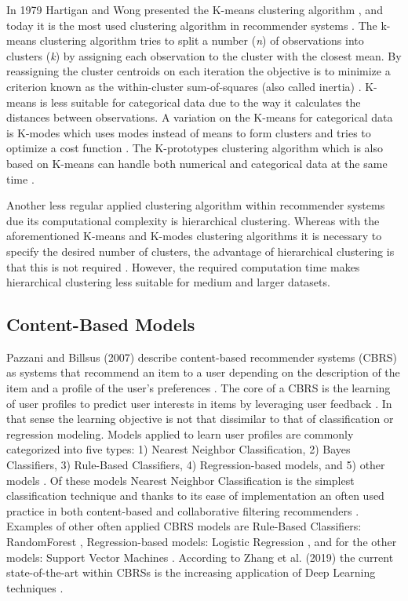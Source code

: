 In 1979 Hartigan and Wong presented the K-means clustering algorithm \cite{hartigan1979algorithm}, and today it is the most used clustering algorithm in recommender systems \cite{aggarwal2016recommender}.
The k-means clustering algorithm tries to split a number (\textit{n}) of observations into clusters (\textit{k}) by assigning each observation to the cluster with the closest mean.
By reassigning the cluster centroids on each iteration the objective is to minimize a criterion known as the within-cluster sum-of-squares (also called inertia) \cite{mackay2003example}. 
K-means is less suitable for categorical data due to the way it calculates the distances between observations.
A variation on the K-means for categorical data is K-modes which uses modes instead of means to form clusters and tries to optimize a cost function \cite{huang1997clustering, huang1998extensions}.
The K-prototypes clustering algorithm which is also based on K-means can handle both numerical and categorical data at the same time \cite{huang1997clustering}.

Another less regular applied clustering algorithm within recommender systems due its computational complexity is hierarchical clustering.
Whereas with the aforementioned K-means and K-modes clustering algorithms it is necessary to specify the desired number of clusters, the advantage of hierarchical clustering is that this is not required \cite{rokach2005clustering}.
However, the required computation time makes hierarchical clustering less suitable for medium and larger datasets. 

\subsection{Content-Based Models}
\label{sec:cbm}
Pazzani and Billsus (2007) describe content-based recommender systems (CBRS) as systems that recommend an item to a user depending on the description of the item and a profile of the user’s preferences \cite{pazzani2007content}.
The core of a CBRS is the learning of user profiles to predict user interests in items by leveraging user feedback \cite{aggarwal2016content}.
In that sense the learning objective is not that dissimilar to that of classification or regression modeling.
Models applied to learn user profiles are commonly categorized into five types: 1) Nearest Neighbor Classification, 2) Bayes Classifiers, 3) Rule-Based Classifiers, 4) Regression-based models, and 5) other models \cite{aggarwal2016content, pazzani2007content}.
Of these models Nearest Neighbor Classification is the simplest classification technique and thanks to its ease of implementation an often used practice in both content-based and collaborative filtering recommenders \cite{balabanovic1997fab}.
Examples of other often applied CBRS models  are Rule-Based Classifiers: RandomForest  \cite{zhang2016three, breiman2001random}, Regression-based models: Logistic Regression \cite{aggarwal2016content, hosmer2013applied}, and for the other models: Support Vector Machines \cite{aggarwal2016content, burges1998tutorial}.
According to Zhang et al. (2019) the current state-of-the-art within CBRSs is the increasing application of Deep Learning techniques \cite{zhang2019deep}.


